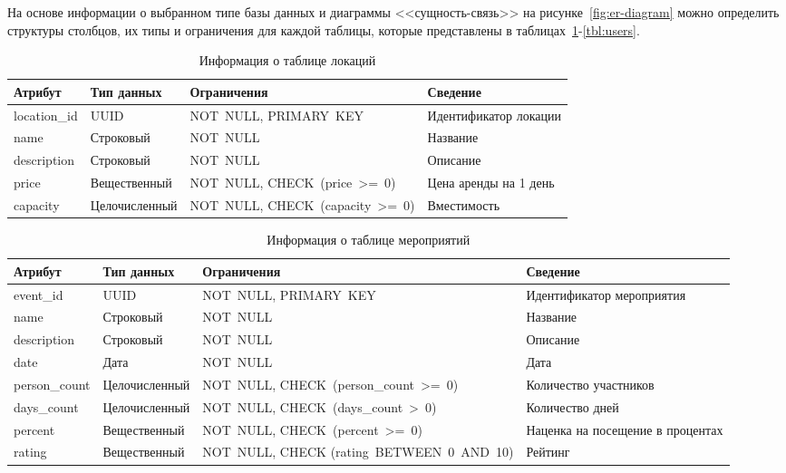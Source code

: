 На основе информации о выбранном типе базы данных и диаграммы <<сущность-связь>> на рисунке~\ref{fig:er-diagram} можно определить структуры столбцов, их типы и ограничения для каждой таблицы, которые представлены в таблицах~\ref{tbl:locations}-\ref{tbl:users}.

\begin{table}[h!]
	\centering
	\caption{Информация о таблице локаций}
	\begin{tabularx}{\textwidth}{|p{2.6cm}|X|p{6cm}|X|}
		\hline
		\textbf{Атрибут} & \textbf{Тип данных} & \textbf{Ограничения} & \textbf{Сведение} \\
		\hline
		location\_id & UUID & NOT~NULL, \newline PRIMARY~KEY & Идентификатор локации \\
		\hline
		name & Строковый & NOT~NULL & Название \\
		\hline
		description & Строковый & NOT~NULL & Описание \\
		\hline
		price & Вещественный & NOT~NULL, \newline CHECK~(price~>=~0) & Цена аренды на 1 день \\
		\hline
		capacity & Целочисленный & NOT~NULL, \newline CHECK~(capacity~>=~0) & Вместимость \\
		\hline
	\end{tabularx}
	\label{tbl:locations}
\end{table}

\begin{table}[h!]
	\centering
	\caption{Информация о таблице мероприятий}
	\begin{tabularx}{\textwidth}{|p{2.6cm}|X|p{6cm}|X|}
		\hline
		\textbf{Атрибут} & \textbf{Тип данных} & \textbf{Ограничения} & \textbf{Сведение} \\
		\hline
		event\_id & UUID & NOT~NULL, \newline PRIMARY~KEY & Идентификатор мероприятия \\
		\hline
		name & Строковый & NOT~NULL & Название \\
		\hline
		description & Строковый & NOT~NULL & Описание \\
		\hline
		date & Дата & NOT~NULL & Дата \\
		\hline
		person\_count & Целочисленный & NOT~NULL, \newline CHECK~(person\_count~>=~0) & Количество участников \\
		\hline
		days\_count & Целочисленный & NOT~NULL, \newline CHECK~(days\_count~>~0) & Количество дней \\
		\hline
		percent & Вещественный & NOT~NULL, \newline CHECK~(percent~>=~0) & Наценка на посещение в процентах \\
		\hline
		rating & Вещественный & NOT~NULL, \newline CHECK (rating~BETWEEN~0~AND~10) & Рейтинг \\
		\hline
	\end{tabularx}
	\label{tbl:events}
\end{table}

